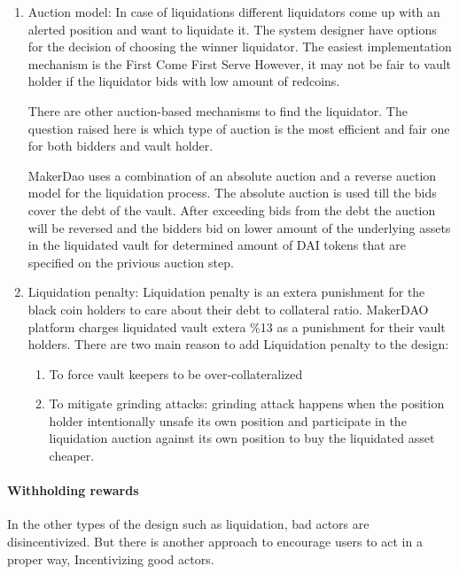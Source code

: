 \begin{enumerate}
  \item Auction model:
In case of liquidations different liquidators come up with an alerted position and want to liquidate it. The system designer have options for the decision of choosing the winner liquidator. 
The easiest implementation mechanism is the First Come First Serve However, it may not be fair to vault holder if the liquidator bids with low amount of redcoins. 

There are other auction-based mechanisms to find the liquidator. The question raised here is which type of auction is the most efficient and fair one for both bidders and vault holder.

MakerDao uses a combination of an absolute auction and a reverse auction model for the liquidation process.
The absolute auction is used till the bids cover the debt of the vault. After exceeding bids from the debt the auction will be reversed and the bidders bid on lower amount of the underlying assets in the liquidated vault for determined amount of DAI tokens that are specified on the privious auction step.
  
  \item Liquidation penalty:
Liquidation penalty is an extera punishment for the black coin holders to care about their debt to collateral ratio.
MakerDAO platform charges liquidated vault extera \%13 as a punishment for their vault holders. There are two main reason to add Liquidation penalty to the design:

\begin{enumerate}

  \item To force vault keepers to be over-collateralized
  \item To mitigate grinding attacks: grinding attack happens when the position holder intentionally unsafe its own position and participate in the liquidation auction against its own position to buy the liquidated asset cheaper.

\end{enumerate}
\end{enumerate}

\paragraph{Withholding rewards}

In the other types of the design such as liquidation, bad actors are disincentivized. But there is another approach to encourage users to act in a proper way, Incentivizing good actors.

